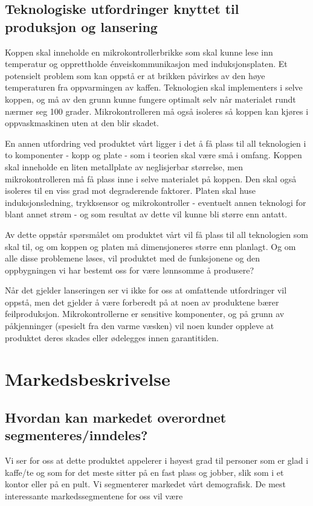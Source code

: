 \subsection{Teknologiske utfordringer knyttet til produksjon og lansering}
Koppen skal inneholde en mikrokontrollerbrikke som skal kunne lese inn temperatur og opprettholde énveiskommunikasjon med induksjonsplaten. Et potensielt problem som kan oppstå er at brikken påvirkes av den høye temperaturen fra oppvarmingen av kaffen. Teknologien skal implementers i selve koppen, og må av den grunn kunne fungere optimalt selv når materialet rundt nærmer seg 100 grader. Mikrokontrolleren må også isoleres så koppen kan kjøres i oppvaskmaskinen uten at den blir skadet.

En annen utfordring ved produktet vårt ligger i det å få plass til all teknologien i to komponenter - kopp og plate - som i teorien skal være små i omfang. Koppen skal inneholde en liten metallplate av neglisjerbar størrelse, men mikrokontrolleren må få plass inne i selve materialet på koppen. Den skal også isoleres til en viss grad mot degraderende faktorer. Platen skal huse induksjonsledning, trykksensor og mikrokontroller - eventuelt annen teknologi for blant annet strøm - og som resultat av dette vil kunne bli større enn antatt. 

Av dette oppstår spørsmålet om produktet vårt vil få plass til all teknologien som skal til, og om koppen og platen må dimensjoneres større enn planlagt. Og om alle disse problemene løses, vil produktet med de funksjonene og den oppbygningen vi har bestemt oss for være lønnsomme å produsere?

Når det gjelder lanseringen ser vi ikke for oss at omfattende utfordringer vil oppstå, men det gjelder å være forberedt på at noen av produktene bærer feilproduksjon. Mikrokontrollerne er sensitive komponenter, og på grunn av påkjenninger (spesielt fra den varme væsken) vil noen kunder oppleve at produktet deres skades eller ødelegges innen garantitiden.

\section{Markedsbeskrivelse}
\subsection{Hvordan kan markedet overordnet segmenteres/inndeles?}
Vi ser for oss at dette produktet appelerer i høyest grad til personer som er glad i kaffe/te og som for det meste sitter på en fast plass og jobber, slik som i et kontor eller på en pult. Vi segmenterer markedet vårt demografisk. De mest interessante markedssegmentene for oss vil være 


